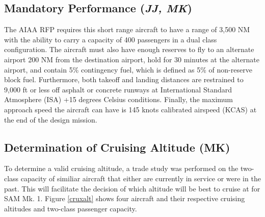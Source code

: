 \subsection{Mandatory Performance (\textit{JJ, MK})}
\label{mand}
The AIAA RFP \cite{RFP} requires this short range aircraft to have a range of 3,500 NM with the ability to carry a capacity of 400 passengers in a dual class configuration. The aircraft must also have enough reserves to fly to an alternate airport 200 NM from the destination airport, hold for 30 minutes at the alternate airport, and contain 5\% contingency fuel, which is defined as 5\% of non-reserve block fuel. Furthermore, both takeoff and landing distances are restrained to 9,000 ft or less off asphalt or concrete runways at International Standard Atmosphere (ISA) +15 degrees Celsius conditions. Finally, the maximum approach speed the aircraft can have is 145 knots calibrated airspeed (KCAS) at the end of the design mission. 



\subsection{Determination of Cruising Altitude (\textbf{MK})}
To determine a valid cruising altitude, a trade study was performed on the two-class capacity of similiar aircraft that either are currently in service or were in the past. This will facilitate the decision of which altitude will be best to cruise at for SAM Mk. 1. Figure \ref{cruxalt} shows four aircraft and their respective cruising altitudes and two-class passenger capacity\cite{butterworth}.

